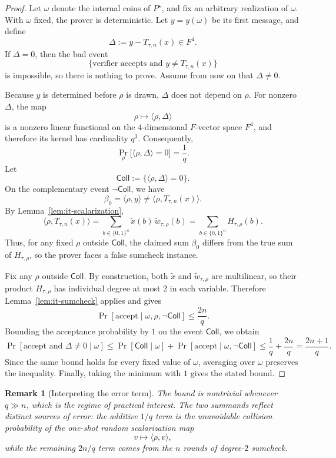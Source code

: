 \documentclass[11pt]{article}
\newtheorem{remark}[theorem]{Remark}
\begin{document}
\begin{proof}
Let $\omega$ denote the internal coins of $P^\star$, and fix an arbitrary realization of $\omega$. With $\omega$ fixed, the prover is deterministic. Let $y=y(\omega)$ be its first message, and define
\[
\Delta:=y-T_{\tau,n}(x)\in F^4.
\]
If $\Delta=0$, then the bad event
\[
\{\text{verifier accepts and } y\neq T_{\tau,n}(x)\}
\]
is impossible, so there is nothing to prove. Assume from now on that $\Delta\neq 0$.

Because $y$ is determined before $\rho$ is drawn, $\Delta$ does not depend on $\rho$. For nonzero $\Delta$, the map
\[
\rho\longmapsto \langle \rho,\Delta\rangle
\]
is a nonzero linear functional on the $4$-dimensional $F$-vector space $F^4$, and therefore its kernel has cardinality $q^3$. Consequently,
\[
\Pr_{\rho}\big[\langle \rho,\Delta\rangle=0\big]=\frac{1}{q}.
\]
Let
\[
\mathsf{Coll}:=\{\langle \rho,\Delta\rangle=0\}.
\]
On the complementary event $\neg\mathsf{Coll}$, we have
\[
\beta_0=\langle \rho,y\rangle\neq \langle \rho,T_{\tau,n}(x)\rangle.
\]
By Lemma~\ref{lem:it-scalarization},
\[
\langle \rho,T_{\tau,n}(x)\rangle
=
\sum_{b\in\{0,1\}^n} \widetilde x(b)\,\widetilde w_{\tau,\rho}(b)
=
\sum_{b\in\{0,1\}^n} H_{\tau,\rho}(b).
\]
Thus, for any fixed $\rho$ outside $\mathsf{Coll}$, the claimed sum $\beta_0$ differs from the true sum of $H_{\tau,\rho}$, so the prover faces a false sumcheck instance.

Fix any $\rho$ outside $\mathsf{Coll}$. By construction, both $\widetilde x$ and $\widetilde w_{\tau,\rho}$ are multilinear, so their product $H_{\tau,\rho}$ has individual degree at most $2$ in each variable. Therefore Lemma~\ref{lem:it-sumcheck} applies and gives
\[
\Pr[\text{accept}\mid \omega,\rho,\neg\mathsf{Coll}]\le \frac{2n}{q}.
\]
Bounding the acceptance probability by $1$ on the event $\mathsf{Coll}$, we obtain
\[
\Pr[\text{accept and }\Delta\neq 0\mid \omega]
\le
\Pr[\mathsf{Coll}\mid \omega]
+
\Pr[\text{accept}\mid \omega,\neg\mathsf{Coll}]
\le
\frac{1}{q}+\frac{2n}{q}
=
\frac{2n+1}{q}.
\]
Since the same bound holds for every fixed value of $\omega$, averaging over $\omega$ preserves the inequality. Finally, taking the minimum with $1$ gives the stated bound.
\end{proof}

\begin{remark}[Interpreting the error term]
The bound is nontrivial whenever $q\gg n$, which is the regime of practical interest. The two summands reflect distinct sources of error: the additive $1/q$ term is the unavoidable collision probability of the one-shot random scalarization map
\[
v\longmapsto \langle \rho,v\rangle,
\]
while the remaining $2n/q$ term comes from the $n$ rounds of degree-$2$ sumcheck.
\end{remark}
\end{document}

